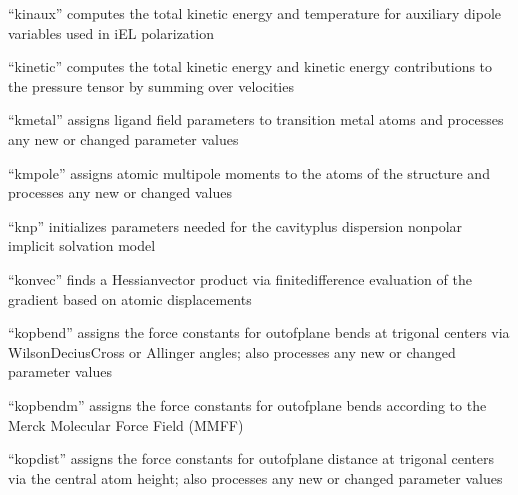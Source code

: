\documentclass[letterpaper,11pt,english]{sphinxmanual}
\begin{document}
\sphinxAtStartPar
“kinaux” computes the total kinetic energy and temperature for auxiliary dipole variables used in iEL polarization

\sphinxAtStartPar
{}

\sphinxAtStartPar
“kinetic” computes the total kinetic energy and kinetic energy contributions to the pressure tensor by summing over velocities

\sphinxAtStartPar
{}

\sphinxAtStartPar
“kmetal” assigns ligand field parameters to transition metal atoms and processes any new or changed parameter values

\sphinxAtStartPar
{}

\sphinxAtStartPar
“kmpole” assigns atomic multipole moments to the atoms of the structure and processes any new or changed values

\sphinxAtStartPar
{}

\sphinxAtStartPar
“knp” initializes parameters needed for the cavity\sphinxhyphen{}plus\sphinxhyphen{} dispersion nonpolar implicit solvation model

\sphinxAtStartPar
{}

\sphinxAtStartPar
“konvec” finds a Hessian\sphinxhyphen{}vector product via finite\sphinxhyphen{}difference evaluation of the gradient based on atomic displacements

\sphinxAtStartPar
{}

\sphinxAtStartPar
“kopbend” assigns the force constants for out\sphinxhyphen{}of\sphinxhyphen{}plane bends at trigonal centers via Wilson\sphinxhyphen{}Decius\sphinxhyphen{}Cross or Allinger angles; also processes any new or changed parameter values

\sphinxAtStartPar
{}

\sphinxAtStartPar
“kopbendm” assigns the force constants for out\sphinxhyphen{}of\sphinxhyphen{}plane bends according to the Merck Molecular Force Field (MMFF)

\sphinxAtStartPar
{}

\sphinxAtStartPar
“kopdist” assigns the force constants for out\sphinxhyphen{}of\sphinxhyphen{}plane distance at trigonal centers via the central atom height; also processes any new or changed parameter values
\end{document}
